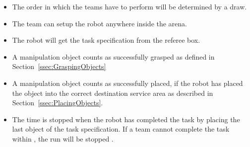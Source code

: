  \begin{itemize}
 \item The order in which the teams have to perform will be determined by a draw.
 \item The team can setup the robot anywhere inside the arena.
 \item The robot will get the task specification from the referee box.
 \item A manipulation object counts as successfully grasped as defined in Section~\ref{ssec:GraspingObjects}
 \item A manipulation object counts as successfully placed, if the robot has placed the object into the correct destination service area as described in Section~\ref{ssec:PlacingObjects}.
 \item {} The time is stopped when the robot has completed the task by placing the last object of the task specification. If a team cannot complete the task within , the run will be stopped .
 \end{itemize}

 
%
%
%
